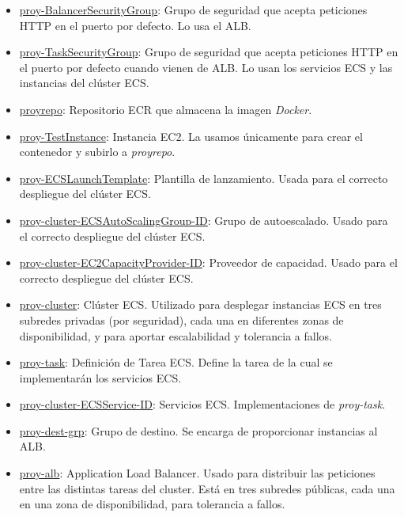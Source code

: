 \begin{itemize}
    \item \underline{proy-BalancerSecurityGroup}: Grupo de seguridad que acepta peticiones HTTP en el puerto por defecto. Lo usa el ALB.

    \item \underline{proy-TaskSecurityGroup}: Grupo de seguridad que acepta peticiones HTTP en el puerto por defecto cuando vienen de ALB. Lo usan los servicios ECS y las instancias del clúster ECS.

    \item \underline{proyrepo}: Repositorio ECR que almacena la imagen \textit{Docker}.

    \item \underline{proy-TestInstance}: Instancia EC2. La usamos únicamente para crear el contenedor y subirlo a \textit{proyrepo}.

    \item \underline{proy-ECSLaunchTemplate}: Plantilla de lanzamiento. Usada para el correcto despliegue del clúster ECS.

    \item \underline{proy-cluster-ECSAutoScalingGroup-ID}: Grupo de autoescalado. Usado para el correcto despliegue del clúster ECS.

    \item \underline{proy-cluster-EC2CapacityProvider-ID}: Proveedor de capacidad. Usado para el correcto despliegue del clúster ECS.

    \item \underline{proy-cluster}: Clúster ECS. Utilizado para desplegar instancias ECS en tres subredes privadas (por seguridad), cada una en diferentes zonas de disponibilidad, y para aportar escalabilidad y tolerancia a fallos.

    \item \underline{proy-task}: Definición de Tarea ECS. Define la tarea de la cual se implementarán los servicios ECS.

    \item \underline{proy-cluster-ECSService-ID}: Servicios ECS. Implementaciones de \textit{proy-task}.

    \item \underline{proy-dest-grp}: Grupo de destino. Se encarga de proporcionar instancias al ALB.

    \item \underline{proy-alb}: Application Load Balancer. Usado para distribuir las peticiones entre las distintas tareas del cluster. Está en tres subredes públicas, cada una en una zona de disponibilidad, para tolerancia a fallos.


\end{itemize}
